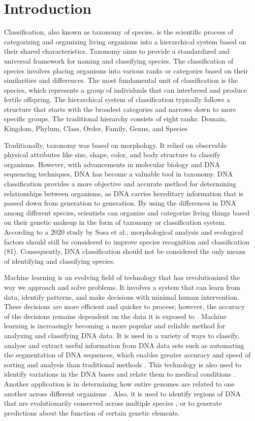 \section{Introduction}

Classification, also known as taxonomy of species, is the scientific process of categorizing and organizing living organisms into a hierarchical system based on their shared characteristics. Taxonomy aims to provide a standardized and universal framework for naming and classifying species. The classification of species involves placing organisms into various ranks or categories based on their similarities and differences. The most fundamental unit of classification is the species, which represents a group of individuals that can interbreed and produce fertile offspring.
The hierarchical system of classification typically follows a structure that starts with the broadest categories and narrows down to more specific groups. The traditional hierarchy consists of eight ranks: Domain, Kingdom, Phylum, Class, Order, Family, Genus, and Species

Traditionally, taxonomy was based on morphology. It relied on observable physical attributes like size, shape, color, and body structure to classify organisms. However, with advancements in molecular biology and DNA sequencing techniques, DNA has become a valuable tool in taxonomy. DNA classification provides a more objective and accurate method for determining relationships between organisms, as DNA carries hereditary information that is passed down from generation to generation.  By using the differences in DNA among different species, scientists can organize and categorize living things based on their genetic makeup in the form of taxonomy or classification system. According to a 2020 study by Sosa et al., morphological analysis and ecological factors should still be considered to improve species recognition and classification (81). Consequently, DNA classification should not be considered the only means of identifying and classifying species. 

Machine learning is an evolving field of technology that has revolutionized the way we approach and solve problems. It involves a system that can learn from data, identify patterns, and make decisions with minimal human intervention. These decisions are more efficient and quicker to process; however, the accuracy of the decisions remains dependent on the data it is exposed to \cite{gama2011}.  Machine learning is increasingly becoming a more popular and reliable method for analyzing and classifying DNA data.  It is used in a variety of ways to classify, analyse and extract useful information from DNA data sets such as automating the segmentation of DNA sequences, which enables greater accuracy and speed of sorting and analysis than traditional methods \cite{chambert2019}. This technology is also used to identify variations in the DNA bases and relate them to medical conditions \cite{Kallman2019}.
Another application is in determining how entire genomes are related to one another across different organisms \cite{cottrell2017}. Also, it is used to identify regions of DNA that are evolutionarily conserved across multiple species \cite{monsalve2019}, or to generate predictions about the function of certain genetic elements. 

